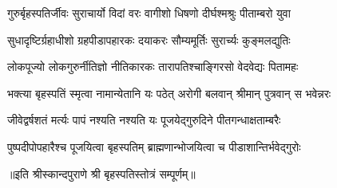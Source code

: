 

\twolineshloka
{गुरुर्बृहस्पतिर्जीवः सुराचार्यो विदां वरः}
{वागीशो धिषणो दीर्घश्मश्रुः पीताम्बरो युवा}

\twolineshloka
{सुधादृष्टिर्ग्रहाधीशो ग्रहपीडापहारकः}
{दयाकरः सौम्यमूर्तिः सुरार्च्यः कुङ्मलद्युतिः}

\twolineshloka
{लोकपूज्यो लोकगुरुर्नीतिज्ञो नीतिकारकः}
{तारापतिश्चाङ्गिरसो वेदवेद्यः पितामहः}

\twolineshloka
{भक्त्या बृहस्पतिं स्मृत्वा नामान्येतानि यः पठेत्}
{अरोगी बलवान् श्रीमान् पुत्रवान् स भवेन्नरः}

\twolineshloka
{जीवेद्वर्षशतं मर्त्यः पापं नश्यति नश्यति}
{यः पूजयेद्गुरुदिने पीतगन्धाक्षताम्बरैः}

\twolineshloka
{पुष्पदीपोपहारैश्च पूजयित्वा बृहस्पतिम्}
{ब्राह्मणान्भोजयित्वा च पीडाशान्तिर्भवेद्गुरोः}

॥इति श्रीस्कान्दपुराणे श्री बृहस्पतिस्तोत्रं सम्पूर्णम्॥
